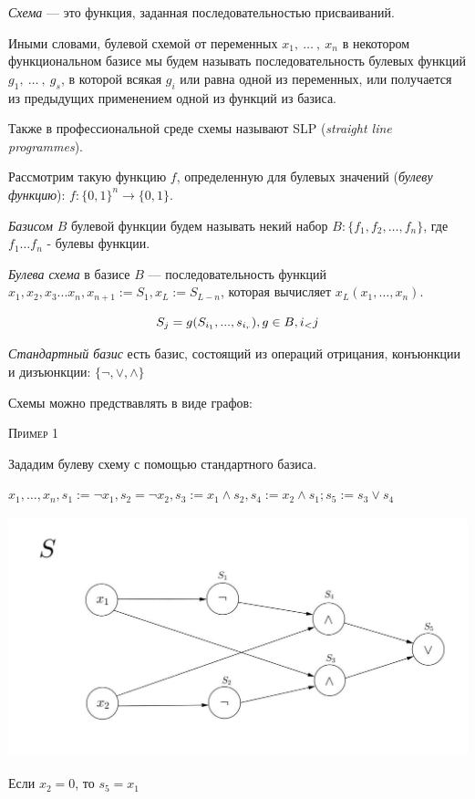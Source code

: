 \documentclass[a4paper, 12pt]{article}
\begin{document}
\textit{Схема} --- это функция, заданная последовательностью присваиваний.

Иными словами, булевой схемой от переменных $x_1,\ \ldots\ ,\ x_n$ в некотором функциональном базисе мы будем называть последовательность булевых функций $g_1,\ \ldots\ ,\ g_s$, в которой всякая $g_i$ или равна одной из переменных, или
получается из предыдущих применением одной из функций из базиса.

Также в профессиональной среде схемы называют SLP (\textit{straight line programmes}). 

Рассмотрим такую функцию $f$, определенную для булевых значений (\textit{булеву функцию}): $f:\{0, 1\}^n \rightarrow \{0, 1\}$.

\textit{Базисом} $B$ булевой функции будем называть некий набор $B:\{f_1, f_2, \ldots , f_n\}$, где $f_1 \ldots f_n$ - булевы функции.

\textit{Булева схема} в базисе $B$  --- последовательность функций $x_1, x_2, x_3... x_n, x_{n+1} := S_1, x_L := S_{L-n}$, которая вычисляет $x_L(x_1, \ldots ,x_n)$. 

\[S_j = g(S_{i_1},  ... , s_{i_r}), g \in B, i_\mathalpha < j\]

\textit{Стандартный базис} есть базис, состоящий из операций отрицания, конъюнкции и дизъюнкции: $\{\lnot, \vee, \wedge\}$

Схемы можно предствавлять в виде графов:

\textsc{Пример 1}

Зададим булеву схему с помощью стандартного базиса.

$x_1, \ldots ,x_n, s_1 := \lnot x_1, s_2 = \lnot x_2, s_3 := x_1 \wedge s_2, s_4 := x_2 \wedge s_1; s_5 := s_3 \vee s_4$

\includegraphics[height=7cm]{images/1.png}
 
 Если $x_2 = 0$, то $s_5 = x_1$
  
\end{document}
